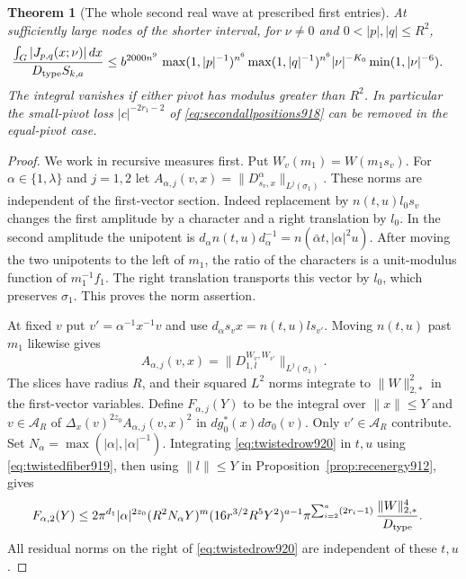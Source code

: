 \documentclass[a4paper,11pt]{article}
\newtheorem{theorem}[proposition]{Theorem}
\theoremstyle{definition}
\theoremstyle{remark}
\numberwithin{equation}{section}
\begin{document}
\begin{theorem}[The whole second real wave at prescribed first entries]
\leavevmode\label{thm:secondsharp920}
At sufficiently large nodes of the shorter interval, for
\(\nu\ne0\) and \(0<|p|,|q|\le R^2\),
\begin{align}
 \frac{\int_G |J_{p,q}(x;\nu)|\,dx}{D_{\rm type}S_{k,a}}
  &\le b^{2000n^9}\,
      \max(1,|p|^{-1})^{n^6}\max(1,|q|^{-1})^{n^6}
      |\nu|^{-K_0}\min(1,|\nu|^{-6}).
 \label{eq:secondsharp920}
\end{align}
The integral vanishes if either pivot has modulus greater than
\(R^2\). In particular the small-pivot loss
\(|c|^{-2r_1-2}\) of \eqref{eq:secondallpositions918} can be
removed in the equal-pivot case.
\end{theorem}
\begin{proof}
We work in recursive measures first. Put \(W_v(m_1)=W(m_1s_v)\).
For \(\alpha\in\{1,\lambda\}\) and \(j=1,2\) let
\(A_{\alpha,j}(v,x)=\|D^\alpha_{s_v,x}\|_{L^j(\sigma_1)}\).
These norms are independent of the first-vector section.
Indeed replacement by \(n(t,u)l_0s_v\) changes the first
amplitude by a character and a right translation by \(l_0\).
In the second amplitude the unipotent is
\(d_\alpha n(t,u)d_\alpha^{-1}=n(\bar\alpha t,|\alpha|^2 u)\).
After moving the two unipotents to the left of \(m_1\), the ratio
of the characters is a unit-modulus function of \(m_1^{-1}f_1\).
The right translation transports this vector by \(l_0\), which
preserves \(\sigma_1\). This proves the norm assertion.

At fixed \(v\) put \(v'=\alpha^{-1}x^{-1}v\) and use
\(d_\alpha s_vx=n(t,u)l s_{v'}\). Moving \(n(t,u)\) past
\(m_1\) likewise gives
\begin{equation}
  A_{\alpha,j}(v,x)=
       \|D_{1,l}^{W_v,W_{v'}}\|_{L^j(\sigma_1)}.
 \label{eq:twistedrow920}
\end{equation}
The slices have radius \(R\), and their squared \(L^2\) norms
integrate to \(\|W\|_{2,*}^2\) in the first-vector variables.
Define \(F_{\alpha,j}(Y)\) to be the integral over
\(\|x\|\le Y\) and \(v\in\mathcal A_R\) of
\(\Delta_x(v)^{2z_0} A_{\alpha,j}(v,x)^2\) in
\(dg_0^*(x)d\sigma_0(v)\). Only \(v'\in\mathcal A_R\) contribute.
Set \(N_\alpha=\max(|\alpha|,|\alpha|^{-1})\).
Integrating \eqref{eq:twistedrow920} in \(t,u\) using
\eqref{eq:twistedfiber919}, then using \(\|l\|\le Y\) in
Proposition~\ref{prop:recenergy912}, gives
\begin{align}
 F_{\alpha,2}(Y)\le {}&
 2\pi^{d_1}|\alpha|^{2z_0}(R^2 N_\alpha Y)^m
 (16r^{3/2}R^5Y^2)^{a-1}
 \pi^{\sum_{i=2}^a(2r_i-1)}\,\frac{\|W\|_{2,*}^4}{D_{\rm type}} .
 \label{eq:weightedendpoint920}
\end{align}
All residual norms on the right of \eqref{eq:twistedrow920}
are independent of these \(t,u\).


\end{proof}
\end{document}
